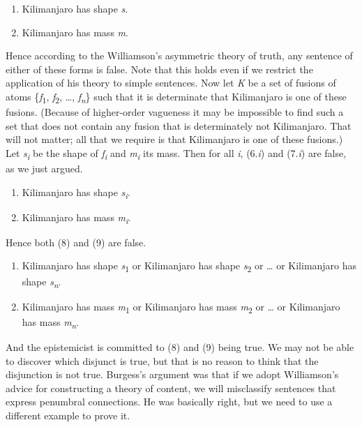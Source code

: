 \begin{enumerate}
\renewcommand{\labelenumi}{(\arabic{enumi})}
\setcounter{enumi}{5}
\item Kilimanjaro has shape \textit{s}.
\item Kilimanjaro has mass \textit{m}.
\end{enumerate}

\noindent Hence according to the Williamson's asymmetric theory of truth, any sentence of either of these forms is false. Note that this holds even if we restrict the application of his theory to simple sentences. Now let \textit{K} be a set of fusions of atoms \{\textit{f}\textsubscript{1}, \textit{f}\textsubscript{2}, {\dots}, \textit{f}\textit{\textsubscript{n}}\} such that it is determinate that Kilimanjaro is one of these fusions. (Because of higher\nobreakdash-order vagueness it may be impossible to find such a set that does not contain any fusion that is determinately not Kilimanjaro. That will not matter; all that we require is that Kilimanjaro is one of these fusions.) Let \textit{s}\textit{\textsubscript{i}} be the shape of \textit{f}\textit{\textsubscript{i}} and \textit{m}\textit{\textsubscript{i}} its mass. Then for all \textit{i}, (6.\textit{i}) and (7.\textit{i}) are false, as we just argued.


\begin{enumerate}
\renewcommand{\labelenumi}{(\arabic{enumi}.\textit{i})}
\setcounter{enumi}{5}
\item Kilimanjaro has shape \textit{s}\textit{\textsubscript{i}}.
\item Kilimanjaro has mass \textit{m}\textit{\textsubscript{i}}.
\end{enumerate}

\noindent Hence both (8) and (9) are false.

\begin{enumerate}
\renewcommand{\labelenumi}{(\arabic{enumi})}
\setcounter{enumi}{7}
\item Kilimanjaro has shape \textit{s}\textsubscript{1} or Kilimanjaro has shape \textit{s}\textsubscript{2} or {\dots} or Kilimanjaro has shape \textit{s}\textit{\textsubscript{n}}.
\item Kilimanjaro has mass \textit{m}\textsubscript{1} or Kilimanjaro has mass \textit{m}\textsubscript{2} or {\dots} or Kilimanjaro has mass \textit{m}\textit{\textsubscript{n}}.
\end{enumerate}

\noindent And the epistemicist is committed to (8) and (9) being true. We may not be able to discover which disjunct is true, but that is no reason to think that the disjunction is not true. Burgess's argument was that if we adopt Williamson's advice for constructing a theory of content, we will misclassify sentences that express penumbral connections. He was basically right, but we need to use a different example to prove it.

